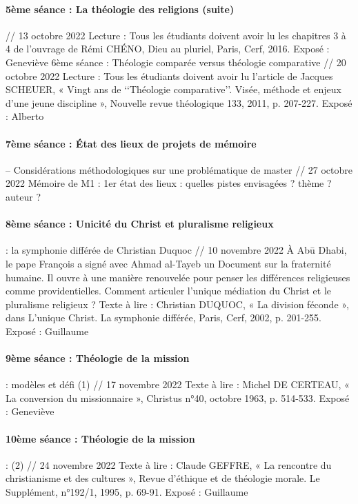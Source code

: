 \paragraph{5ème séance : La théologie des religions (suite)} // 13 octobre 2022
Lecture : Tous les étudiants doivent avoir lu les chapitres 3 à 4 de l’ouvrage de Rémi CHÉNO, Dieu au pluriel, Paris, Cerf, 2016. 
 Exposé : Geneviève
6ème séance : Théologie comparée versus théologie comparative // 20 octobre 2022 
Lecture : Tous les étudiants doivent avoir lu l’article de Jacques SCHEUER, « Vingt ans de ‘‘Théologie comparative’’. Visée, méthode et enjeux d’une jeune discipline », Nouvelle revue théologique 133, 2011, p. 207-227.
Exposé : Alberto

\paragraph{7ème séance : État des lieux de projets de mémoire} – Considérations méthodologiques sur une problématique de master // 27 octobre 2022 
Mémoire de M1 : 1er état des lieux : quelles pistes envisagées ? thème ? auteur ?  
 
\paragraph{8ème séance : Unicité du Christ et pluralisme religieux} : la symphonie différée de Christian Duquoc // 10 novembre 2022
 À Abū Dhabi, le pape François a signé avec Ahmad al-Tayeb un Document sur la fraternité humaine. Il ouvre à une manière renouvelée pour penser les différences religieuses comme providentielles. Comment articuler l’unique médiation du Christ et le pluralisme religieux ? 
Texte à lire : Christian DUQUOC, « La division féconde », dans L’unique Christ. La symphonie différée, Paris, Cerf, 2002, p. 201-255. 
Exposé : Guillaume

\paragraph{9ème séance : Théologie de la mission} : modèles et défi (1) // 17 novembre 2022
Texte à lire : Michel DE CERTEAU, « La conversion du missionnaire », Christus n°40, octobre 1963, p. 514-533.
Exposé : Geneviève

\paragraph{10ème séance : Théologie de la mission} :  (2) // 24 novembre 2022
Texte à lire : Claude GEFFRE, « La rencontre du christianisme et des cultures », Revue d’éthique et de théologie morale. Le Supplément, n°192/1, 1995, p. 69-91.
Exposé : Guillaume 

